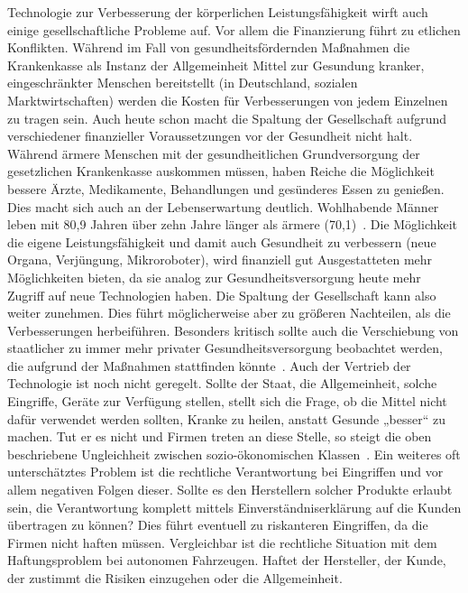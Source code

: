\documentclass[a4paper,
DIV=13,
12pt,
BCOR=10mm,
department=FakEI,
twoside,
parskip=half,
automark,
]{OTHRartcl}
\begin{document}
Technologie zur Verbesserung der körperlichen Leistungsfähigkeit wirft auch einige gesellschaftliche Probleme auf. Vor allem die Finanzierung führt zu etlichen Konflikten. Während im Fall von gesundheitsfördernden Maßnahmen die Krankenkasse als
Instanz der Allgemeinheit Mittel zur Gesundung kranker, eingeschränkter Menschen bereitstellt (in Deutschland, sozialen Marktwirtschaften) werden die Kosten für Verbesserungen von jedem Einzelnen zu tragen sein. Auch heute schon macht die Spaltung der
Gesellschaft aufgrund verschiedener finanzieller Voraussetzungen vor der Gesundheit nicht halt. Während ärmere Menschen mit der gesundheitlichen Grundversorgung der gesetzlichen Krankenkasse auskommen müssen, haben Reiche die Möglichkeit bessere Ärzte, Medikamente,
Behandlungen und gesünderes Essen zu genießen. Dies macht sich auch an der Lebenserwartung deutlich. Wohlhabende Männer leben mit 80,9 Jahren über zehn Jahre länger als ärmere (70,1)~\cite{lampert2014}. Die Möglichkeit die eigene Leistungsfähigkeit und damit
auch Gesundheit zu verbessern (neue Organa, Verjüngung, Mikroroboter), wird finanziell gut Ausgestatteten mehr Möglichkeiten bieten, da sie analog zur Gesundheitsversorgung heute mehr Zugriff auf neue Technologien haben. Die Spaltung der Gesellschaft kann also weiter
zunehmen. Dies führt möglicherweise aber zu größeren Nachteilen, als die Verbesserungen herbeiführen. Besonders kritisch sollte auch die Verschiebung von staatlicher zu immer mehr privater Gesundheitsversorgung beobachtet werden, die aufgrund der Maßnahmen stattfinden
könnte~\cite{khan_aziz_2019}. Auch der Vertrieb der Technologie ist noch nicht geregelt. Sollte der Staat, die Allgemeinheit, solche Eingriffe, Geräte zur Verfügung stellen, stellt sich die Frage, ob die Mittel nicht dafür verwendet werden sollten, Kranke zu heilen, anstatt
Gesunde „besser“ zu machen. Tut er es nicht und Firmen treten an diese Stelle, so steigt die oben beschriebene Ungleichheit zwischen sozio-ökonomischen Klassen~\cite{khan_aziz_2019}. Ein weiteres oft unterschätztes Problem ist die rechtliche Verantwortung bei Eingriffen und
vor allem negativen Folgen dieser. Sollte es den Herstellern solcher Produkte erlaubt sein, die Verantwortung komplett mittels Einverständniserklärung auf die Kunden übertragen zu können? Dies führt eventuell zu riskanteren Eingriffen, da die Firmen nicht haften müssen.
Vergleichbar ist die rechtliche Situation mit dem Haftungsproblem bei autonomen Fahrzeugen. Haftet der Hersteller, der Kunde, der zustimmt die Risiken einzugehen oder die Allgemeinheit.
\end{document}
